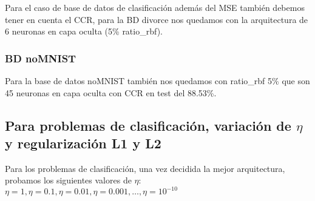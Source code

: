 Para el caso de base de datos de clasificación además del MSE también debemos tener en cuenta el CCR, para la BD divorce nos quedamos con la arquitectura de 6 neuronas en capa oculta (5\% ratio\_rbf).

\subsubsection{BD noMNIST}
\begin{table}[H]
\centering
\vspace{1ex}
\small
{}
\caption{Base de datos noMNIST}
\label{table:tabla noMNIST}
\end{table}

Para la base de datos noMNIST también nos quedamos con ratio\_rbf 5\% que son 45 neuronas en capa oculta con CCR en test del 88.53\%.

\subsection{Para problemas de clasificación, variación de $\eta$ y regularización L1 y L2}
Para los problemas de clasificación, una vez decidida la mejor arquitectura, probamos los siguientes valores de $\eta$: $\eta=1, \eta=0.1, \eta=0.01, \eta=0.001, \ldots , \eta=10^{-10}$ 

